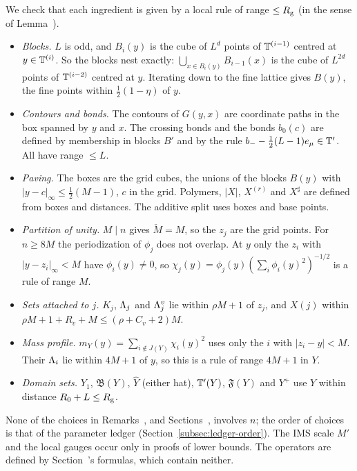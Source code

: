 \begin{detail}\label{d9:inventory}
We check that each ingredient is given by a local rule of range $\le R_{\rm g}$ (in the sense of Lemma~).
\begin{step}[(a) Geometry]
\begin{itemize}
\item \emph{Blocks.} $L$ is odd, and $B_i(y)$ is the cube of $L^d$ points of $\mathbb T^{(i-1)}$ centred at $y\in\mathbb T^{(i)}$. So the blocks nest exactly: $\bigcup_{x\in B_i(y)}B_{i-1}(x)$ is the cube of $L^{2d}$ points of $\mathbb T^{(i-2)}$ centred at $y$. Iterating down to the fine lattice gives $B(y)$, the fine points within $\frac12(1-\eta)$ of $y$.
\item \emph{Contours and bonds.} The contours of $G(y,x)$ are coordinate paths in the box spanned by $y$ and $x$. The crossing bonds and the bonds $b_0(c)$ are defined by membership in blocks $B'$ and by the rule $b_--\frac12(L-1)e_\mu\in\mathbb T'$. All have range $\le L$.
\item \emph{Paving.} The boxes are the grid cubes, the unions of the blocks $B(y)$ with $|y-c|_\infty\le\frac12(M-1)$, $c$ in the grid. Polymers, $|X|$, $X^{(r)}$ and $X^\sharp$ are defined from boxes and distances. The additive split uses boxes and base points.
\item \emph{Partition of unity.} $M\mid n$ gives $\check M=M$, so the $z_j$ are the grid points. For $n\ge8M$ the periodization of $\phi_j$ does not overlap. At $y$ only the $z_i$ with $|y-z_i|_\infty<M$ have $\phi_i(y)\ne0$, so $\chi_j(y)=\phi_j(y)(\sum_i\phi_i(y)^2)^{-1/2}$ is a rule of range $M$.
\item \emph{Sets attached to $j$.} $K_j$, $\Lambda_j$ and $\Lambda^v_j$ lie within $\rho M+1$ of $z_j$, and $X(j)$ within $\rho M+1+R_v+M\le(\rho+C_v+2)M$.
\item \emph{Mass profile.} $m_Y(y)=\sum_{i\notin J(Y)}\chi_i(y)^2$ uses only the $i$ with $|z_i-y|<M$. Their $\Lambda_i$ lie within $4M+1$ of $y$, so this is a rule of range $4M+1$ in $Y$.
\item \emph{Domain sets.} $Y_1$, $\mathfrak B(Y)$, $\hat Y$ (either hat), $\mathbb T'(Y)$, $\mathfrak F(Y)$ and $Y^+$ use $Y$ within distance $R_0+L\le R_{\rm g}$.
\end{itemize}
\end{step}
\begin{step}[(b) Constants]
None of the choices in Remarks~,  and Sections~,  involves $n$; the order of choices is that of the parameter ledger (Section~\ref{subsec:ledger-order}). The IMS scale $M'$ and the local gauges occur only in proofs of lower bounds. The operators are defined by Section~'s formulas, which contain neither.

\end{step}
\end{detail}
